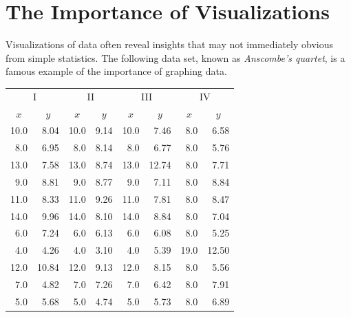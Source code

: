 \label{lab:DataVis}

\section*{The Importance of Visualizations} %

Visualizations of data often reveal insights that may not immediately obvious from simple statistics.
The following data set, known as \emph{Anscombe's quartet}, is a famous example of the importance of graphing data.

\begin{table}[H]
\small{
\begin{tabular}{rr|rr|rr|rr}
    \multicolumn{2}{c|}{I}    & \multicolumn{2}{|c|}{II} &
    \multicolumn{2}{|c|}{III} & \multicolumn{2}{|c}{IV} \\
    \multicolumn{1}{c}{$x$}   & \multicolumn{1}{c|}{$y$} &
    \multicolumn{1}{|c}{$x$}  & \multicolumn{1}{c|}{$y$} &
    \multicolumn{1}{|c}{$x$}  & \multicolumn{1}{c|}{$y$} &
    \multicolumn{1}{|c}{$x$}  & \multicolumn{1}{c}{$y$} \\
    \hline
    10.0 & 8.04  & 10.0 & 9.14 & 10.0 & 7.46  & 8.0  & 6.58  \\
    8.0  & 6.95  & 8.0  & 8.14 & 8.0  & 6.77  & 8.0  & 5.76  \\
    13.0 & 7.58  & 13.0 & 8.74 & 13.0 & 12.74 & 8.0  & 7.71  \\
    9.0  & 8.81  & 9.0  & 8.77 & 9.0  & 7.11  & 8.0  & 8.84  \\
    11.0 & 8.33  & 11.0 & 9.26 & 11.0 & 7.81  & 8.0  & 8.47  \\
    14.0 & 9.96  & 14.0 & 8.10 & 14.0 & 8.84  & 8.0  & 7.04  \\
    6.0  & 7.24  & 6.0  & 6.13 & 6.0  & 6.08  & 8.0  & 5.25  \\
    4.0  & 4.26  & 4.0  & 3.10 & 4.0  & 5.39  & 19.0 & 12.50 \\
    12.0 & 10.84 & 12.0 & 9.13 & 12.0 & 8.15  & 8.0  & 5.56  \\
    7.0  & 4.82  & 7.0  & 7.26 & 7.0  & 6.42  & 8.0  & 7.91  \\
    5.0  & 5.68  & 5.0  & 4.74 & 5.0  & 5.73  & 8.0  & 6.89  \\
\end{tabular}}
\end{table}

